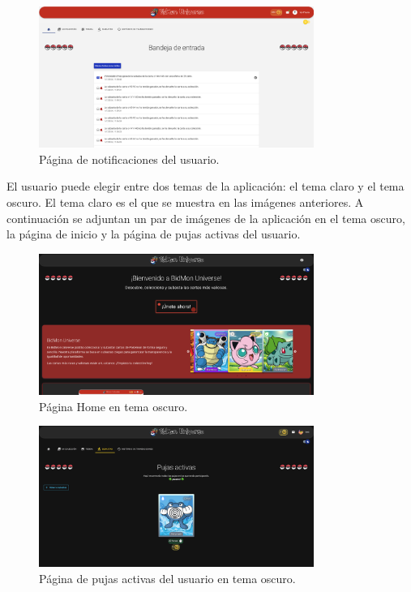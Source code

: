 \begin{figure}[H]
    \centering
    \includegraphics[width=0.8\textwidth]{figures/6-Analisis/6-Interfaz/interfaz/notificaciones_2.png}
    \caption{Página de notificaciones del usuario.}
    \label{fig:interfaz-notificaciones}
\end{figure}


El usuario puede elegir entre dos temas de la aplicación: el tema claro y el tema oscuro.
El tema claro es el que se muestra en las imágenes anteriores.
A continuación se adjuntan un par de imágenes de la aplicación en el tema oscuro, la página de inicio
y la página de pujas activas del usuario.

\begin{figure}[H]
    \centering
    \includegraphics[width=0.8\textwidth]{figures/6-Analisis/6-Interfaz/interfaz/home_dark.png}
    \caption{Página Home en tema oscuro.}
    \label{fig:interfaz-home-dark}
\end{figure}

\begin{figure}[H]
    \centering
    \includegraphics[width=0.8\textwidth]{figures/6-Analisis/6-Interfaz/interfaz/pujas_dark.png}
    \caption{Página de pujas activas del usuario en tema oscuro.}
    \label{fig:interfaz-pujas-dark}
\end{figure}